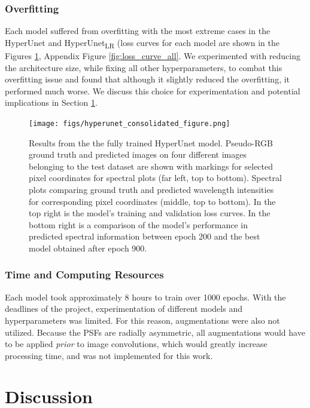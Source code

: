 \documentclass{article}
\begin{document}
\subsubsection{Overfitting}
Each model suffered from overfitting with the most extreme cases in the HyperUnet and HyperUnet\textsubscript{LR} (loss curves for each model are shown in the Figures \ref{fig:HyperUnet_results}, Appendix Figure \ref{fig:loss_curve_all}. We experimented with reducing the architecture size, while fixing all other hyperparameters, to combat this overfitting issue and found that although it slightly reduced the overfitting, it performed much worse. We discuss this choice for experimentation and potential implications in Section \ref{sec:discussion}.

\begin{figure}[!h]
\centering
\texttt{[image: figs/hyperunet\_consolidated\_figure.png]}
    \caption{Results from the the fully trained HyperUnet model. Pseudo-RGB ground truth and predicted images on four different images belonging to the test dataset are shown with markings for selected pixel coordinates for spectral plots (far left, top to bottom). Spectral plots comparing ground truth and predicted wavelength intensities for corresponding pixel coordinates (middle, top to bottom). In the top right is the model's training and validation loss curves. In the bottom right is a comparison of the model's performance in predicted spectral information between epoch 200 and the best model obtained after epoch 900.}
    \label{fig:HyperUnet_results}
\end{figure}

\subsubsection{Time and Computing Resources}
\label{sec:resourcelimitations}
Each model took approximately $8$ hours to train over 1000 epochs. With the deadlines of the project, experimentation of different models and hyperparameters was limited. For this reason, augmentations were also not utilized. Because the PSFs are radially asymmetric, all augmentations would have to be applied \textit{prior} to image convolutions, which would greatly increase processing time, and was not implemented for this work.

\section{Discussion}
\label{sec:discussion}
\end{document}
